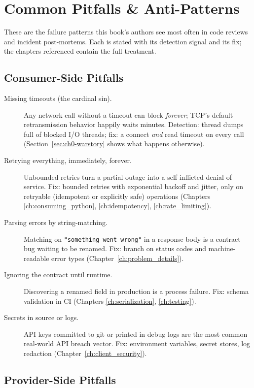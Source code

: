 \section{Common Pitfalls \& Anti-Patterns}
\label{sec:ch0-pitfalls}

These are the failure patterns this book's authors see most often in code
reviews and incident post-mortems. Each is stated with its detection signal
and its fix; the chapters referenced contain the full treatment.

\subsection{Consumer-Side Pitfalls}

\begin{description}
  \item[Missing timeouts (the cardinal sin).] Any network call without a
    timeout can block \emph{forever}; TCP's default retransmission behavior
    happily waits minutes. Detection: thread dumps full of blocked I/O
    threads; fix: a connect \emph{and} read timeout on every call
    (Section~\ref{sec:ch0-warstory} shows what happens otherwise).
  \item[Retrying everything, immediately, forever.] Unbounded retries turn a
    partial outage into a self-inflicted denial of service. Fix: bounded
    retries with exponential backoff and jitter, only on retryable
    (idempotent or explicitly safe) operations (Chapters
    \ref{ch:consuming_python}, \ref{ch:idempotency}, \ref{ch:rate_limiting}).
  \item[Parsing errors by string-matching.] Matching on
    \texttt{"something went wrong"} in a response body is a contract bug
    waiting to be renamed. Fix: branch on status codes and
    machine-readable error types (Chapter~\ref{ch:problem_details}).
  \item[Ignoring the contract until runtime.] Discovering a renamed field in
    production is a process failure. Fix: schema validation in CI
    (Chapters \ref{ch:serialization}, \ref{ch:testing}).
  \item[Secrets in source or logs.] API keys committed to git or printed in
    debug logs are the most common real-world API breach vector. Fix:
    environment variables, secret stores, log redaction
    (Chapter~\ref{ch:client_security}).
\end{description}

\subsection{Provider-Side Pitfalls}

